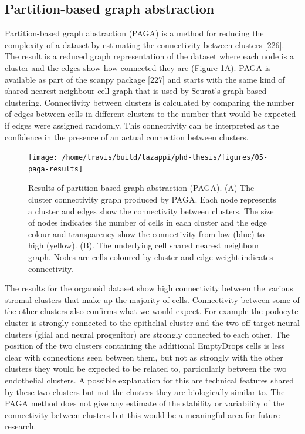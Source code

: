 \documentclass[11pt,a4paper,titlepage,twoside,openright]{style/unimelbthesis}
\theoremstyle{definition}
\theoremstyle{definition}
\theoremstyle{definition}
\theoremstyle{remark}
\begin{document}
\begin{mainmatter}
\hypertarget{partition-based-graph-abstraction}{%
\subsection{Partition-based graph abstraction}\label{partition-based-graph-abstraction}}

Partition-based graph abstraction (PAGA) is a method for reducing the complexity of a dataset by estimating the connectivity between clusters {[}226{]}. The result is a reduced graph representation of the dataset where each node is a cluster and the edges show how connected they are (Figure \ref{fig:paga-results}A). PAGA is available as part of the scanpy package {[}227{]} and starts with the same kind of shared nearest neighbour cell graph that is used by Seurat's graph-based clustering. Connectivity between clusters is calculated by comparing the number of edges between cells in different clusters to the number that would be expected if edges were assigned randomly. This connectivity can be interpreted as the confidence in the presence of an actual connection between clusters.

\begin{figure}

{\centering \texttt{[image: /home/travis/build/lazappi/phd-thesis/figures/05-paga-results]} 

}

\caption[Results of partition-based graph abstraction (PAGA).]{Results of partition-based graph abstraction (PAGA). (A) The cluster connectivity graph produced by PAGA. Each node represents a cluster and edges show the connectivity between clusters. The size of nodes indicates the number of cells in each cluster and the edge colour and transparency show the connectivity from low (blue) to high (yellow). (B). The underlying cell shared nearest neighbour graph. Nodes are cells coloured by cluster and edge weight indicates connectivity.}\label{fig:paga-results}
\end{figure}





The results for the organoid dataset show high connectivity between the various stromal clusters that make up the majority of cells. Connectivity between some of the other clusters also confirms what we would expect. For example the podocyte cluster is strongly connected to the epithelial cluster and the two off-target neural clusters (glial and neural progenitor) are strongly connected to each other. The position of the two clusters containing the additional EmptyDrops cells is less clear with connections seen between them, but not as strongly with the other clusters they would be expected to be related to, particularly between the two endothelial clusters. A possible explanation for this are technical features shared by these two clusters but not the clusters they are biologically similar to. The PAGA method does not give any estimate of the stability or variability of the connectivity between clusters but this would be a meaningful area for future research.


\end{mainmatter}
\end{document}
